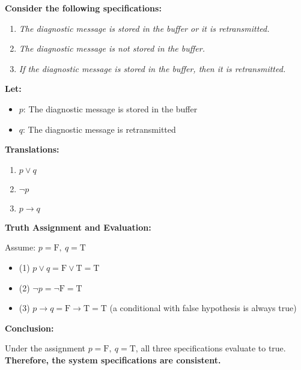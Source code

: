\begin{tcolorbox}[title=Example 2: Determine Consistency of System Specifications]
\textbf{Consider the following specifications:}
\begin{enumerate}
    \item \textit{The diagnostic message is stored in the buffer or it is retransmitted.}
    \item \textit{The diagnostic message is not stored in the buffer.}
    \item \textit{If the diagnostic message is stored in the buffer, then it is retransmitted.}
\end{enumerate}

\textbf{Let:}
\begin{itemize}
  \item $p$: The diagnostic message is stored in the buffer
  \item $q$: The diagnostic message is retransmitted
\end{itemize}

\vspace{0.5em}

\textbf{Translations:}
\begin{enumerate}
    \item $p \lor q$
    \item $\neg p$
    \item $p \rightarrow q$
\end{enumerate}

\textbf{Truth Assignment and Evaluation:}

Assume: \( p = \text{F},\ q = \text{T} \)

\begin{itemize}
    \item (1) \( p \lor q = \text{F} \lor \text{T} = \text{T} \)
    \item (2) \( \neg p = \neg \text{F} = \text{T} \)
    \item (3) \( p \rightarrow q = \text{F} \rightarrow \text{T} = \text{T} \) (a conditional with false hypothesis is always true)
\end{itemize}

\textbf{Conclusion:}

Under the assignment \( p = \text{F},\ q = \text{T} \), all three specifications evaluate to true.  \\
\textbf{Therefore, the system specifications are consistent.}

\end{tcolorbox}
